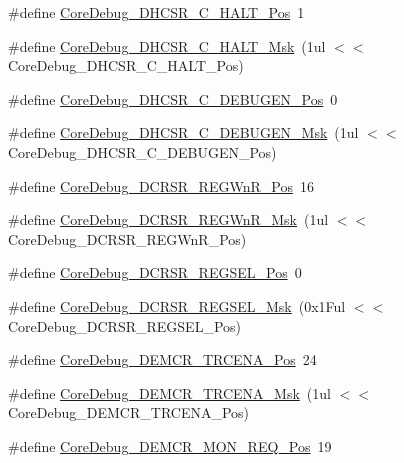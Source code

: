 \begin{DoxyCompactItemize}
\item 
\#define \hyperlink{group__CMSIS__CM3__CoreDebug_gaddf1d43f8857e4efc3dc4e6b15509692}{Core\+Debug\+\_\+\+D\+H\+C\+S\+R\+\_\+\+C\+\_\+\+H\+A\+L\+T\+\_\+\+Pos}~1
\item 
\#define \hyperlink{group__CMSIS__CM3__CoreDebug_ga1d905a3aa594eb2e8bb78bcc4da05b3f}{Core\+Debug\+\_\+\+D\+H\+C\+S\+R\+\_\+\+C\+\_\+\+H\+A\+L\+T\+\_\+\+Msk}~(1ul $<$$<$ Core\+Debug\+\_\+\+D\+H\+C\+S\+R\+\_\+\+C\+\_\+\+H\+A\+L\+T\+\_\+\+Pos)
\item 
\#define \hyperlink{group__CMSIS__CM3__CoreDebug_gab557abb5b172b74d2cf44efb9d824e4e}{Core\+Debug\+\_\+\+D\+H\+C\+S\+R\+\_\+\+C\+\_\+\+D\+E\+B\+U\+G\+E\+N\+\_\+\+Pos}~0
\item 
\#define \hyperlink{group__CMSIS__CM3__CoreDebug_gab815c741a4fc2a61988cd2fb7594210b}{Core\+Debug\+\_\+\+D\+H\+C\+S\+R\+\_\+\+C\+\_\+\+D\+E\+B\+U\+G\+E\+N\+\_\+\+Msk}~(1ul $<$$<$ Core\+Debug\+\_\+\+D\+H\+C\+S\+R\+\_\+\+C\+\_\+\+D\+E\+B\+U\+G\+E\+N\+\_\+\+Pos)
\item 
\#define \hyperlink{group__CMSIS__CM3__CoreDebug_ga51e75942fc0614bc9bb2c0e96fcdda9a}{Core\+Debug\+\_\+\+D\+C\+R\+S\+R\+\_\+\+R\+E\+G\+Wn\+R\+\_\+\+Pos}~16
\item 
\#define \hyperlink{group__CMSIS__CM3__CoreDebug_ga1eef4992d8f84bc6c0dffed1c87f90a5}{Core\+Debug\+\_\+\+D\+C\+R\+S\+R\+\_\+\+R\+E\+G\+Wn\+R\+\_\+\+Msk}~(1ul $<$$<$ Core\+Debug\+\_\+\+D\+C\+R\+S\+R\+\_\+\+R\+E\+G\+Wn\+R\+\_\+\+Pos)
\item 
\#define \hyperlink{group__CMSIS__CM3__CoreDebug_ga52182c8a9f63a52470244c0bc2064f7b}{Core\+Debug\+\_\+\+D\+C\+R\+S\+R\+\_\+\+R\+E\+G\+S\+E\+L\+\_\+\+Pos}~0
\item 
\#define \hyperlink{group__CMSIS__CM3__CoreDebug_ga17cafbd72b55030219ce5609baa7c01d}{Core\+Debug\+\_\+\+D\+C\+R\+S\+R\+\_\+\+R\+E\+G\+S\+E\+L\+\_\+\+Msk}~(0x1\+Ful $<$$<$ Core\+Debug\+\_\+\+D\+C\+R\+S\+R\+\_\+\+R\+E\+G\+S\+E\+L\+\_\+\+Pos)
\item 
\#define \hyperlink{group__CMSIS__CM3__CoreDebug_ga6ff2102b98f86540224819a1b767ba39}{Core\+Debug\+\_\+\+D\+E\+M\+C\+R\+\_\+\+T\+R\+C\+E\+N\+A\+\_\+\+Pos}~24
\item 
\#define \hyperlink{group__CMSIS__CM3__CoreDebug_ga5e99652c1df93b441257389f49407834}{Core\+Debug\+\_\+\+D\+E\+M\+C\+R\+\_\+\+T\+R\+C\+E\+N\+A\+\_\+\+Msk}~(1ul $<$$<$ Core\+Debug\+\_\+\+D\+E\+M\+C\+R\+\_\+\+T\+R\+C\+E\+N\+A\+\_\+\+Pos)
\item 
\#define \hyperlink{group__CMSIS__CM3__CoreDebug_ga341020a3b7450416d72544eaf8e57a64}{Core\+Debug\+\_\+\+D\+E\+M\+C\+R\+\_\+\+M\+O\+N\+\_\+\+R\+E\+Q\+\_\+\+Pos}~19
$$
\end{DoxyCompactItemize}
